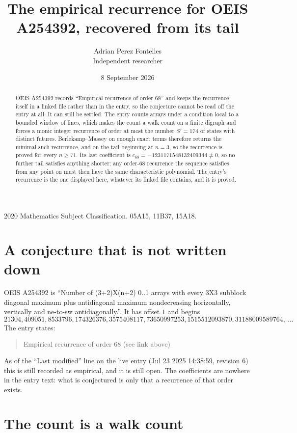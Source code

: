 \documentclass[11pt,a4paper]{article}
\title{The empirical recurrence for OEIS A254392, recovered from its tail}
\author{Adrian Perez Fontelles\\ \small Independent researcher}
\date{8 September 2026}
\theoremstyle{plain}
\theoremstyle{definition}
\begin{document}
\maketitle

\begin{abstract}
OEIS A254392 records ``Empirical recurrence of order $68$'' and keeps the recurrence itself in
a linked file rather than in the entry, so the conjecture cannot be read off the entry at all.
It can still be settled. The entry counts arrays under a condition local to a bounded window of
lines, which makes the count a walk count on a finite digraph and forces a monic integer
recurrence of order at most the number $S'=174$ of states with distinct futures. Berlekamp--Massey on
enough exact terms therefore returns the minimal such recurrence, and on the tail beginning at $n=3$, so the recurrence is proved for every $n\ge71$.
Its last coefficient is $c_{68}=-1231171548132409344\neq0$, so no further tail satisfies anything
shorter; any order-$68$ recurrence the sequence satisfies from any point on must then have
the same characteristic polynomial. The entry's recurrence is the one displayed here, whatever
its linked file contains, and it is proved.
\end{abstract}

\noindent\small 2020 Mathematics Subject Classification. 05A15, 11B37, 15A18.\normalsize

\section{A conjecture that is not written down}

OEIS A254392 is ``Number of (3+2)X(n+2) 0..1 arrays with every 3X3 subblock diagonal maximum plus antidiagonal maximum nondecreasing horizontally, vertically and ne-to-sw antidiagonally.''. It has offset $1$ and begins
\[
21304, 409051, 8533796, 174326376, 3575408117, 73650997253, 1515512093870, 31188009589764,\ \dots
\]
The entry states:
\begin{quote}
Empirical recurrence of order 68 (see link above)
\end{quote}
As of the ``Last modified'' line on the live entry (Jul 23 2025 14:38:59, revision 6)
this is still recorded as empirical, and it is still open. The coefficients are nowhere in the
entry text: what is conjectured is only that a recurrence of that order exists.

\section{The count is a walk count}
\end{document}
